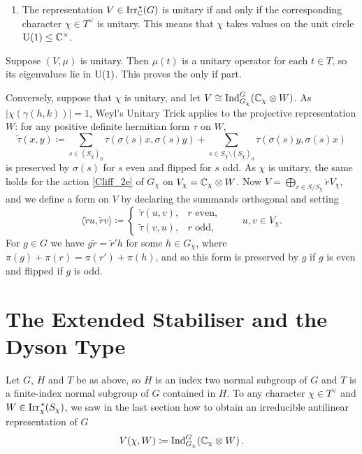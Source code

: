 \begin{enumerate}[resume, label=\textnormal{(\Roman*)}]  
\item The representation $V\in {\operatorname{Irr}_{{\mathbb C}}^{\hspace{0.1em} \star}(G)}$ is unitary if and only if the corresponding character
  $\chi\in T^\vee$ is unitary. This means that $\chi$ takes values on the unit circle $\operatorname{U}(1) \leq {\mathbb C}^\times$. 
    \end{enumerate} 

\begin{just}
Suppose $(V,\mu)$ is unitary. Then $\mu(t)$ is a unitary operator for each $t \in T$, so its eigenvalues lie in $\operatorname{U}(1)$. This proves the only if part.

Conversely, suppose that $\chi$ is unitary, and let $V \cong \operatorname{Ind}_{G_{\chi}}^{G}({\mathbb C}_{\chi} \otimes W)$. As $|\chi(\gamma(h,k))| = 1$, Weyl's Unitary Trick applies to the projective representation $W$: for any positive definite hermitian form $\tau$ on $W$,
\[
\widetilde{\tau}(x,y) \coloneqq \sum_{s \in (S_{\chi})_0} \tau(\sigma(s)x, \sigma(s)y) + \sum_{s \in S_{\chi} \setminus (S_{\chi})_0} \tau(\sigma(s)y, \sigma(s)x)
\]
is preserved by $\sigma(s)$ for $s$ even and flipped for $s$ odd. As $\chi$ is unitary, the same holds for the action \eqref{Cliff_2e} of $G_{\chi}$ on $V_{\chi} = {\mathbb C}_{\chi} \otimes W$. Now $V = \bigoplus_{r \in S/S_{\chi}} \breve{r} V_{\chi}$, and we define a form on $V$ by declaring the summands orthogonal and setting
\[
\langle \breve{r}u, \breve{r}v \rangle \coloneqq \begin{cases} \widetilde{\tau}(u,v), & r \text{ even}, \\ \widetilde{\tau}(v,u), & r \text{ odd}, \end{cases} \qquad u,v \in V_{\chi}.
\]
For $g \in G$ we have $g \breve{r} = \breve{r}' h$ for some $h \in G_{\chi}$, where $\pi(g) + \pi(r) = \pi(r') + \pi(h)$, and so this form is preserved by $g$ if $g$ is even and flipped if $g$ is odd.
\end{just}

\section{The Extended Stabiliser and the Dyson Type}\label{sect:extendedstabiliser}

Let $G$, $H$ and $T$ be as above, so $H$ is an index two normal subgroup of $G$ and $T$ is a finite-index normal subgroup of $G$ contained in $H$. To any character $\chi \in T^{\vee}$ and $W \in \operatorname{Irr}_{\chi}^{\hspace{0.1em} \star}(S_\chi)$, we saw in the last section how to obtain an irreducible antilinear representation of $G$
\[V(\chi, W) \coloneqq \operatorname{Ind}_{G_\chi}^G ({\mathbb C}_\chi \otimes W)\, .\]

